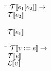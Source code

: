 \begin{tabbing}
\qquad \= \quad \kill
$\TT{e_1[e_2]} \rightarrow$\\
\>$\TT{e_2}$\\
\\
\>$\TT{e_1}$\\
\end{tabbing}


\begin{tabbing}
\qquad \= \quad \kill
$\TT{v := e} \rightarrow$\\
\>$\TT{e}$\\
$\mathcal{L}\lsq v\rsq$
\end{tabbing}


